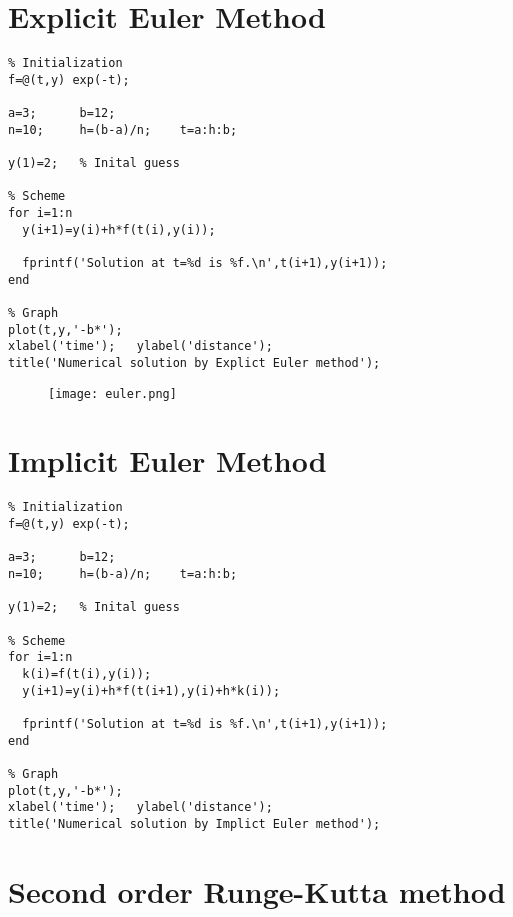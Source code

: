 \section{Explicit Euler Method}

\begin{verbatim}
% Initialization
f=@(t,y) exp(-t);

a=3;      b=12;
n=10;     h=(b-a)/n;    t=a:h:b;

y(1)=2;   % Inital guess

% Scheme
for i=1:n
  y(i+1)=y(i)+h*f(t(i),y(i));

  fprintf('Solution at t=%d is %f.\n',t(i+1),y(i+1));
end

% Graph
plot(t,y,'-b*');
xlabel('time');   ylabel('distance');
title('Numerical solution by Explict Euler method');
\end{verbatim}

\begin{figure}[h]
  \centering
  \texttt{[image: euler.png]}
\end{figure}

\vspace{9mm}

\section{Implicit Euler Method}

\begin{verbatim}
% Initialization
f=@(t,y) exp(-t);

a=3;      b=12;
n=10;     h=(b-a)/n;    t=a:h:b;

y(1)=2;   % Inital guess

% Scheme
for i=1:n
  k(i)=f(t(i),y(i));
  y(i+1)=y(i)+h*f(t(i+1),y(i)+h*k(i));

  fprintf('Solution at t=%d is %f.\n',t(i+1),y(i+1));
end

% Graph
plot(t,y,'-b*');
xlabel('time');   ylabel('distance');
title('Numerical solution by Implict Euler method');
\end{verbatim}
\clearpage

\section{Second order Runge-Kutta method}

